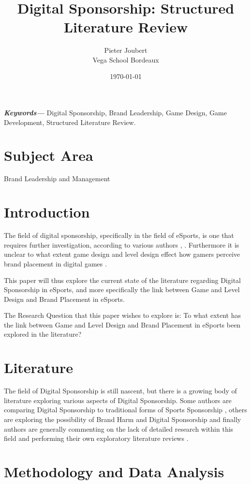 \documentclass[10pt,twoside]{article}
\title{Digital Sponsorship: Structured Literature Review}
\author{Pieter Joubert \\
	Vega School Bordeaux \\
	}
\date{\today}
\providecommand{\keywords}[1]
{
  \small	
  \textbf{\textit{Keywords---}} #1
}
\begin{document}
\maketitle
\keywords{Digital Sponsorship, Brand Leadership, Game Design, Game Development, Structured Literature Review.}

\section{Subject Area}
Brand Leadership and Management
\section{Introduction}

The field of digital sponsorship, specifically in the field of eSports, is one that requires further investigation, according to various authors \cite{huettermann2020esports}, \cite{Elasri-Ejjaberi2020}. Furthermore it is unclear to what extent game design and level design effect how gamers perceive brand placement in digital games \cite{hwang2017effects}.

This paper will thus explore the current state of the literature regarding Digital Sponsorship in eSports, and more specifically the link between Game and Level Design and Brand Placement in eSports.

The Research Question that this paper wishes to explore is: To what extent has the link between Game and Level Design and Brand Placement in eSports been explored in the literature?

\section{Literature}
The field of Digital Sponsorship is still nascent, but there is a growing body of literature exploring various aspects of Digital Sponsorship. Some authors are comparing Digital Sponsorship to traditional forms of Sports Sponsorship \cite{huettermann2020esports}, others are exploring the possibility of Brand Harm and Digital Sponsorship \cite{Freitas2019} and finally authors are generally commenting on the lack of detailed research within this field and performing their own exploratory literature reviews \cite{Elasri-Ejjaberi2020}.

\section{Methodology and Data Analysis}
\end{document}
